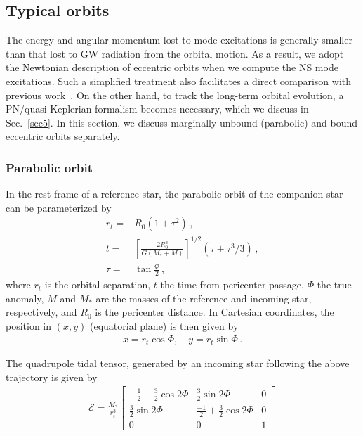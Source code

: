 \documentclass[prd,aps,floatfix,superscriptaddress,nofootinbib,twocolumn,10pt,English]{revtex4}
\begin{document}
\subsection{Typical orbits}

The energy and angular momentum lost to mode
excitations is generally smaller than that lost to GW radiation from
the orbital motion. As a result, we adopt the Newtonian description of
eccentric orbits when we compute the NS mode excitations. Such a
simplified treatment also facilitates a direct comparison with previous
work~\cite{chirenti2016gravitational,press1977formation}. On the
other hand, to track the long-term orbital evolution, a
PN/quasi-Keplerian formalism \cite{blanchet2014gravitational} becomes
necessary, which we discuss in Sec.~\ref{sec5}. In this section, we
discuss marginally unbound (parabolic) and bound eccentric orbits separately.

\subsubsection{Parabolic orbit}\label{sec:hyper}

In the rest frame of a reference star,  the parabolic orbit of the companion star can be parameterized by
\begin{align}\label{eqntrajectory}
 r_t=& R_0(1+\tau^2)\,,\nonumber \\
 t= &\left [ \frac{2R^3_0}{G(M_*+M)}\right ]^{1/2}(\tau+\tau^3/3)\,,\nonumber \\
 \tau=&\tan \frac{\Phi}{2}\,,
 \end{align}
 where $r_t$ is the orbital separation, $t$ the time from
   pericenter passage, $\Phi$ the true anomaly, $M$ and $M_*$ are the
 masses of the reference and incoming star, respectively, and $R_0$ is
 the pericenter distance. In Cartesian coordinates, the position in
 $(x,y)$ (equatorial plane) is then given by
 \begin{align}
 x=r_t \cos \Phi,\quad y=r_t \sin \Phi\,.
 \end{align}
 
 The quadrupole tidal tensor, generated by an incoming star following the above trajectory is given by
  \begin{align}
 \mathcal{E}= \frac{M_*}{r_t^3}\left [ \begin{array}{ccc}
 -\frac{1}{2}-\frac{3}{2}\cos 2\Phi & \frac{3}{2}  \sin 2\Phi & 0\\
 \frac{3}{2}  \sin 2\Phi & \frac{-1}{2}+\frac{3}{2} \cos 2\Phi & 0 \\
 0 & 0 & 1
   \end{array}
 \right ]
 \end{align}
\end{document}
